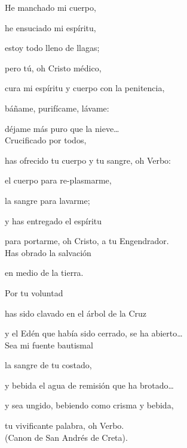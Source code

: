 \begin{patercite}
	He manchado mi cuerpo,
	
	he ensuciado mi espíritu,
	
	estoy todo lleno de llagas;
	
	pero tú, oh Cristo médico,
	
	cura mi espíritu y cuerpo con la penitencia,
	
	báñame, purifícame, lávame:
	
	déjame más puro que la nieve\ldots{} \\
	
	Crucificado por todos,
	
	has ofrecido tu cuerpo y tu sangre, oh Verbo:
	
	el cuerpo para re-plasmarme,
	
	la sangre para lavarme;
	
	y has entregado el espíritu
	
	para portarme, oh Cristo, a tu Engendrador. \\
	
	Has obrado la salvación
	
	en medio de la tierra.
	
	Por tu voluntad
	
	has sido clavado en el árbol de la Cruz
	
	y el Edén que había sido cerrado, se ha abierto\ldots{} \\
	
	Sea mi fuente bautismal
	
	la sangre de tu costado,
	
	y bebida el agua de remisión que ha brotado\ldots{}
	
	y sea ungido, bebiendo como crisma y bebida,
	
	tu vivificante palabra, oh Verbo. \\
	
	(Canon de San Andrés de Creta).
\end{patercite}